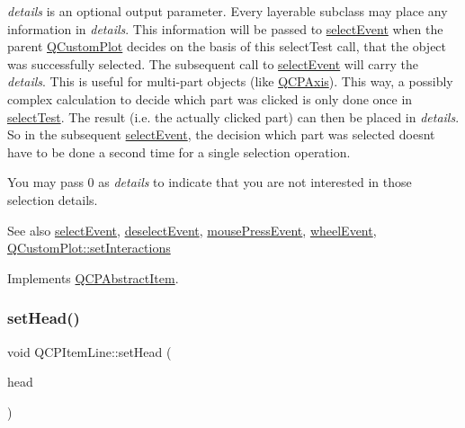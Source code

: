 {\itshape details} is an optional output parameter. Every layerable subclass may place any information in {\itshape details}. This information will be passed to \hyperlink{class_q_c_p_abstract_item_aa4b969c58797f39c9c0b6c07c7869d17}{select\+Event} when the parent \hyperlink{class_q_custom_plot}{Q\+Custom\+Plot} decides on the basis of this select\+Test call, that the object was successfully selected. The subsequent call to \hyperlink{class_q_c_p_abstract_item_aa4b969c58797f39c9c0b6c07c7869d17}{select\+Event} will carry the {\itshape details}. This is useful for multi-\/part objects (like \hyperlink{class_q_c_p_axis}{Q\+C\+P\+Axis}). This way, a possibly complex calculation to decide which part was clicked is only done once in \hyperlink{class_q_c_p_item_line_a8e02bfbca04fbcf3dbc375a2bf693229}{select\+Test}. The result (i.\+e. the actually clicked part) can then be placed in {\itshape details}. So in the subsequent \hyperlink{class_q_c_p_abstract_item_aa4b969c58797f39c9c0b6c07c7869d17}{select\+Event}, the decision which part was selected doesn\textquotesingle{}t have to be done a second time for a single selection operation.

You may pass 0 as {\itshape details} to indicate that you are not interested in those selection details.

\begin{DoxySeeAlso}{See also}
\hyperlink{class_q_c_p_abstract_item_aa4b969c58797f39c9c0b6c07c7869d17}{select\+Event}, \hyperlink{class_q_c_p_abstract_item_af9093798cb07a861dcc73f93ca16c0c1}{deselect\+Event}, \hyperlink{class_q_c_p_layerable_af6567604818db90f4fd52822f8bc8376}{mouse\+Press\+Event}, \hyperlink{class_q_c_p_layerable_a47dfd7b8fd99c08ca54e09c362b6f022}{wheel\+Event}, \hyperlink{class_q_custom_plot_a5ee1e2f6ae27419deca53e75907c27e5}{Q\+Custom\+Plot\+::set\+Interactions} 
\end{DoxySeeAlso}


Implements \hyperlink{class_q_c_p_abstract_item_ae41d0349d68bb802c49104afd100ba2a}{Q\+C\+P\+Abstract\+Item}.

\mbox{\label{class_q_c_p_item_line_aebf3d687114d584e0459db6759e2c3c3}} 
\subsubsection{\texorpdfstring{set\+Head()}{setHead()}}
{\footnotesize\ttfamily void Q\+C\+P\+Item\+Line\+::set\+Head (\begin{DoxyParamCaption}\item[{const \hyperlink{class_q_c_p_line_ending}{Q\+C\+P\+Line\+Ending} \&}]{head }\end{DoxyParamCaption})}


